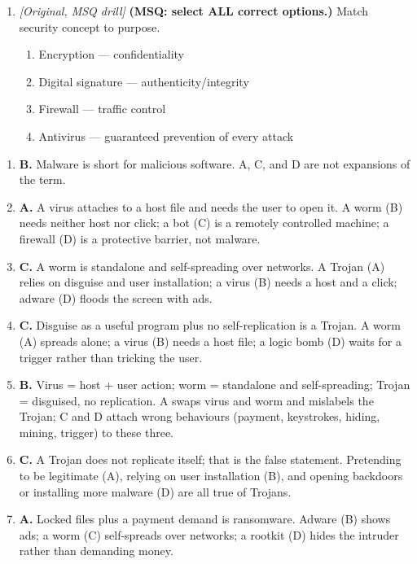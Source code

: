 \begin{enumerate}[label=\textbf{Q\arabic*.}, leftmargin=*]
\item \textit{[Original, MSQ drill]} \textbf{(MSQ: select ALL correct options.)} Match security concept to purpose.
  \begin{enumerate}[label=\Alph*.]
\item Encryption --- confidentiality
   \item Digital signature --- authenticity/integrity
   \item Firewall --- traffic control
   \item Antivirus --- guaranteed prevention of every attack
  \end{enumerate}

\end{enumerate}
\begin{enumerate}[label=\textbf{Q\arabic*.}, leftmargin=*]
\item \textbf{B.} Malware is short for malicious software. A, C, and D are
  not expansions of the term.
\item \textbf{A.} A virus attaches to a host file and needs the user to open
  it. A worm (B) needs neither host nor click; a bot (C) is a remotely
  controlled machine; a firewall (D) is a protective barrier, not malware.
\item \textbf{C.} A worm is standalone and self-spreading over networks. A
  Trojan (A) relies on disguise and user installation; a virus (B) needs a
  host and a click; adware (D) floods the screen with ads.
\item \textbf{C.} Disguise as a useful program plus no self-replication is a
  Trojan. A worm (A) spreads alone; a virus (B) needs a host file; a logic
  bomb (D) waits for a trigger rather than tricking the user.
\item \textbf{B.} Virus = host + user action; worm = standalone and
  self-spreading; Trojan = disguised, no replication. A swaps virus and worm
  and mislabels the Trojan; C and D attach wrong behaviours (payment,
  keystrokes, hiding, mining, trigger) to these three.
\item \textbf{C.} A Trojan does not replicate itself; that is the false
  statement. Pretending to be legitimate (A), relying on user installation
  (B), and opening backdoors or installing more malware (D) are all true of
  Trojans.
\item \textbf{A.} Locked files plus a payment demand is ransomware. Adware
  (B) shows ads; a worm (C) self-spreads over networks; a rootkit (D) hides
  the intruder rather than demanding money.

\end{enumerate}
